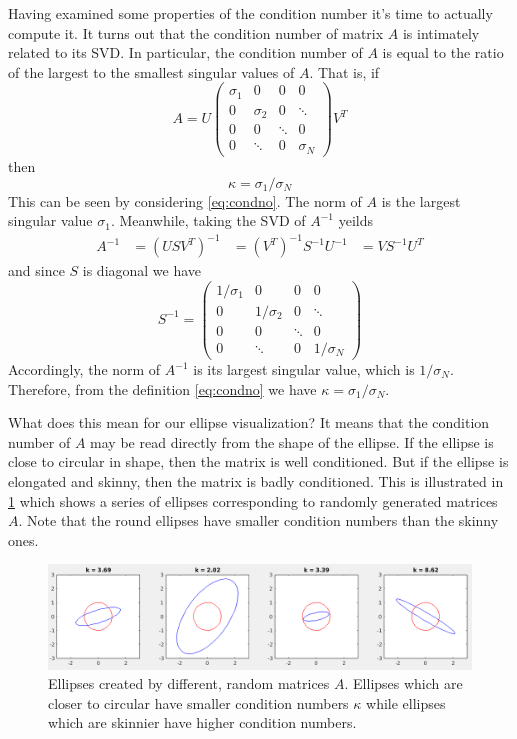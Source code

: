 \documentclass[onefignum,onetabnum]{siamart190516}
\begin{document}
Having examined some properties of the condition number it's time to actually
compute it.  It turns out that the condition number of matrix $A$ is intimately related
to its SVD.  In particular, the condition number of $A$ is equal to
the ratio of the largest to the smallest singular values of $A$.  That is,
if
$$
A = U 
\begin{pmatrix}
\sigma_1 & 0 & 0 & 0 \\
0 & \sigma_2 & 0 & \ddots \\
0 & 0 & \ddots & 0 \\
0 & \ddots & 0 & \sigma_N
\end{pmatrix}
V^T
$$
then
$$ 
\kappa = \sigma_1 /  \sigma_N 
$$
This can be seen by considering \cref{eq:condno}.  The norm of $A$ is 
the largest singular value $\sigma_1$.  Meanwhile, taking the
SVD of $A^{-1}$ yeilds
\begin{equation*}
\begin{aligned}
A^{-1} & = (U S V^T)^{-1} 
& = (V^T)^{-1} S^{-1} U^{-1}
& = V S^{-1} U^T
\end{aligned}
\end{equation*}
and since $S$ is diagonal we have
\begin{equation}
S^{-1} = 
\begin{pmatrix}
1/\sigma_1 & 0 & 0 & 0 \\
0 & 1/\sigma_2 & 0 &  \ddots \\
0 & 0 & \ddots & 0 \\
0 & \ddots & 0 & 1/\sigma_N
\end{pmatrix}
\end{equation}
Accordingly, the norm of $A^{-1}$ is its largest singular value, 
which is $1/\sigma_N$.  Therefore, from the definition \cref{eq:condno} we have
 $\kappa = \sigma_1 /  \sigma_N$.

What does this mean for our ellipse visualization?  It means that the condition
number of $A$ may be read directly from the shape of the ellipse.
If the ellipse is close to circular in shape, then the matrix is well
conditioned.  But if the ellipse is elongated and skinny, then the matrix
is badly conditioned.  This is illustrated in \cref{fig:EllipsesWithCondNo}
which shows a series of ellipses corresponding to randomly generated
matrices $A$.  Note that the round ellipses have smaller condition numbers
than the skinny ones.

\begin{figure}[thb]
	\centering
	\includegraphics[width=1.0\columnwidth]{EllipsesWithCondNo.png}
	\caption{Ellipses created by different, random matrices $A$.  Ellipses
		which are closer to circular have smaller condition numbers $\kappa$
		while ellipses which are skinnier have higher condition numbers.}
	\label{fig:EllipsesWithCondNo}
\end{figure}
\end{document}
